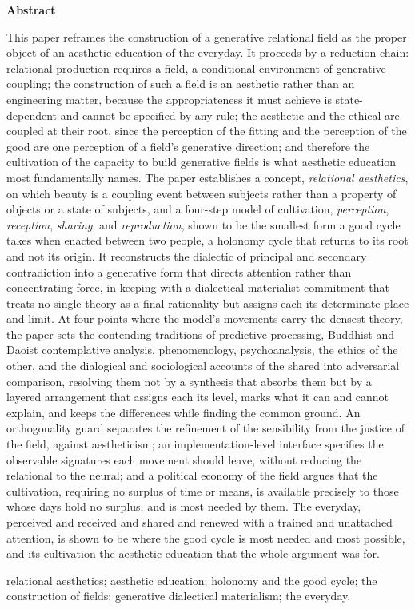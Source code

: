\begin{center}
{\color{deeprose}\bfseries\large Abstract}
\end{center}

\vspace{0.4em}

\noindent
This paper reframes the construction of a generative relational field as the proper object of an aesthetic education of the everyday. It proceeds by a reduction chain: relational production requires a field, a conditional environment of generative coupling; the construction of such a field is an aesthetic rather than an engineering matter, because the appropriateness it must achieve is state-dependent and cannot be specified by any rule; the aesthetic and the ethical are coupled at their root, since the perception of the fitting and the perception of the good are one perception of a field's generative direction; and therefore the cultivation of the capacity to build generative fields is what aesthetic education most fundamentally names. The paper establishes a concept, \emph{relational aesthetics}, on which beauty is a coupling event between subjects rather than a property of objects or a state of subjects, and a four-step model of cultivation, \emph{perception}, \emph{reception}, \emph{sharing}, and \emph{reproduction}, shown to be the smallest form a good cycle takes when enacted between two people, a holonomy cycle that returns to its root and not its origin. It reconstructs the dialectic of principal and secondary contradiction into a generative form that directs attention rather than concentrating force, in keeping with a dialectical-materialist commitment that treats no single theory as a final rationality but assigns each its determinate place and limit. At four points where the model's movements carry the densest theory, the paper sets the contending traditions of predictive processing, Buddhist and Daoist contemplative analysis, phenomenology, psychoanalysis, the ethics of the other, and the dialogical and sociological accounts of the shared into adversarial comparison, resolving them not by a synthesis that absorbs them but by a layered arrangement that assigns each its level, marks what it can and cannot explain, and keeps the differences while finding the common ground. An orthogonality guard separates the refinement of the sensibility from the justice of the field, against aestheticism; an implementation-level interface specifies the observable signatures each movement should leave, without reducing the relational to the neural; and a political economy of the field argues that the cultivation, requiring no surplus of time or means, is available precisely to those whose days hold no surplus, and is most needed by them. The everyday, perceived and received and shared and renewed with a trained and unattached attention, is shown to be where the good cycle is most needed and most possible, and its cultivation the aesthetic education that the whole argument was for.

\vspace{1em}

 \enspace relational aesthetics; aesthetic education; holonomy and the good cycle; the construction of fields; generative dialectical materialism; the everyday.
